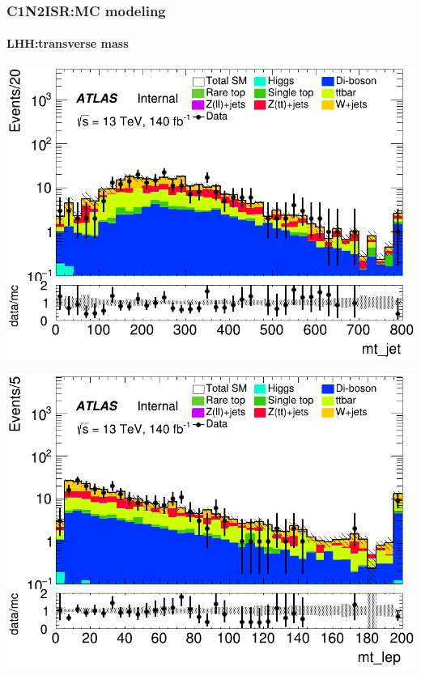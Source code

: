 \documentclass[usenames,dvipsnames]{beamer}
\begin{document}
\begin{frame}
\frametitle{C1N2ISR:MC modeling}
\framesubtitle{LHH:\quad transverse mass}
    \begin{minipage}{0.32\textwidth}
        \centering
        \includegraphics[width=\textwidth]{graphics/LHH_met/LHH_met_mt_jet.png}
    \end{minipage}
    \hfill
    \begin{minipage}{0.32\textwidth}
        \centering
        \includegraphics[width=\textwidth]{graphics/LHH_met/LHH_met_mt_lep.png}
    \end{minipage}
    \hfill
    \begin{minipage}{0.32\textwidth}
        \centering

\end{minipage}
\end{frame}
\end{document}
